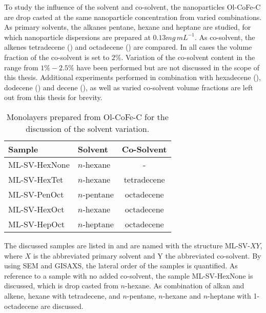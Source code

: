\documentclass[\main/dresen_thesis.tex]{subfiles}
\begin{document}
      To study the influence of the solvent and co-solvent, the nanoparticles Ol-CoFe-C are drop casted at the same nanoparticle concentration from varied combinations.
      As primary solvents, the alkanes pentane, hexane and heptane are studied, for which nanoparticle dispersions are prepared at $0.13 \unit{mg \, mL^{-1}}$.
      As co-solvent, the alkenes tetradecene () and octadecene () are compared.
      In all cases the volume fraction of the co-solvent is set to $2 \%$.
      Variation of the co-solvent content in the range from $1 \% - 2.5 \%$ have been performed but are not discussed in the scope of this thesis. %
      Additional experiments performed in combination with hexadecene (), dodecene () and decene (), as well as varied co-solvent volume fractions are left out from this thesis for brevity.
      \begin{table}[!htbp]
        \centering
        \caption{\label{tab:monolayers:charMethod:varyAlkaneAlkene}Monolayers prepared from Ol-CoFe-C for the discussion of the solvent variation.}
        \begin{tabular}{ l | l | c }
          \textbf{Sample} & Solvent              & Co-Solvent \\
          \hline
          ML-SV-HexNone   & $\mathit{n}$-hexane  & -          \\
          ML-SV-HexTet    & $\mathit{n}$-hexane  & tetradecene\\
          ML-SV-PenOct    & $\mathit{n}$-pentane & octadecene \\
          ML-SV-HexOct    & $\mathit{n}$-hexane  & octadecene \\
          ML-SV-HepOct    & $\mathit{n}$-heptane & octadecene \\
          \hline
        \end{tabular}
      \end{table}

      The discussed samples are listed in  and are named with the structure ML-SV-$XY$, where $X$ is the abbreviated primary solvent and Y the abbreviated co-solvent.
      By using SEM and GISAXS, the lateral order of the samples is quantified.
      As reference to a sample with no added co-solvent, the sample ML-SV-HexNone is discussed, which is drop casted from $\mathit{n}$-hexane.
      As combination of alkan and alkene, hexane with tetradecene, and $\mathit{n}$-pentane, $\mathit{n}$-hexane and $\mathit{n}$-heptane with 1-octadecene are discussed.
\end{document}
